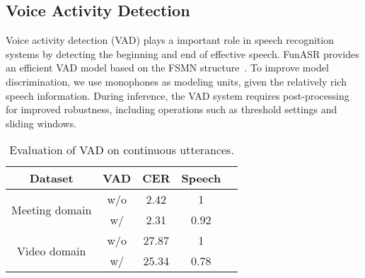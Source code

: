 \documentclass{INTERSPEECH2023}
\begin{document}
\subsection{Voice Activity Detection}

Voice activity detection (VAD) plays a important role in speech recognition systems by detecting the beginning and end of effective speech. FunASR provides an efficient VAD model based on the FSMN structure~\cite{zhang2018deep}. To improve model discrimination, we use monophones as modeling units, given the relatively rich speech information. During inference, the VAD system requires post-processing for improved robustness, including operations such as threshold settings and sliding windows.

\begin{table}[h]
    \vspace{-1mm}
    \centering
    \caption{Evaluation of VAD on continuous utterances.}
    \vspace{-2mm}
    \begin{tabular}{ccccc}
        \midrule
        Dataset & VAD & CER & Speech \\
        \hline
        \multirow{2}{*}{Meeting domain} &w/o & 2.42 & 1 \\
        &w/ & 2.31 & 0.92 \\
        \hline
        \multirow{2}{*}{Video domain} &w/o & 27.87 & 1 \\
        &w/ & 25.34 & 0.78 \\
        \midrule
    \end{tabular}
    \label{tab:vad_res}
    \vspace{-3mm}
\end{table}
\end{document}
